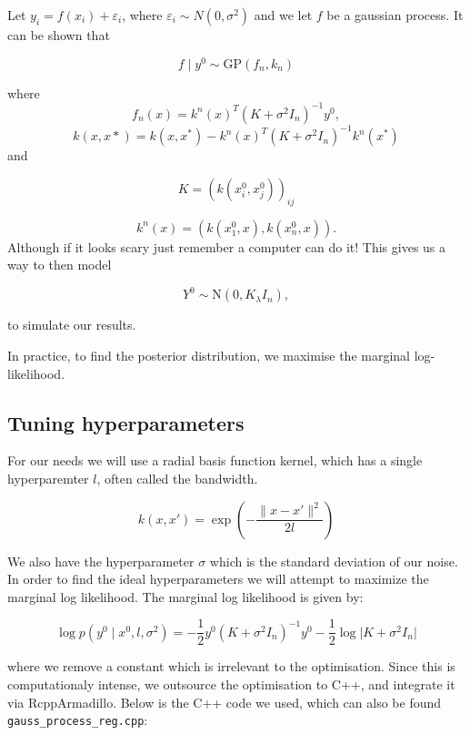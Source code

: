 \documentclass[
]{article}
\begin{document}
Let \(y_i = f(x_i) + \varepsilon_i\), where
\(\varepsilon_i \sim N(0, \sigma^2)\) and we let \(f\) be a gaussian
process. It can be shown that

\[
f \mid y^0 \sim \text{GP}(f_n,k_n)
\]

where \[f_n(x) = k^n(x)^T(K + \sigma^2I_n)^{-1}y^0,\]
\[k(x,x*) = k(x, x^*) - k^n(x)^T (K + \sigma^2 I_n)^{-1} k^n(x^*)\] and

\[
K = (k(x_i^0,x_j^0))_{ij}
\]

\[
k^n(x) = (k(x_1^0,x),k(x_n^0,x)).
\] Although if it looks scary just remember a computer can do it! This
gives us a way to then model

\[Y^0 \sim \text{N}(0,K _ \lambda I_n),\]

to simulate our results.

In practice, to find the posterior distribution, we maximise the
marginal log-likelihood.

\hypertarget{tuning-hyperparameters}{%
\subsection{Tuning hyperparameters}\label{tuning-hyperparameters}}

For our needs we will use a radial basis function kernel, which has a
single hyperparemter \(l\), often called the bandwidth.

\[
k(x, x') = \exp\left(-\frac{\lVert x - x' \rVert^2}{2l}\right)
\]

We also have the hyperparameter \(\sigma\) which is the standard
deviation of our noise. In order to find the ideal hyperparameters we
will attempt to maximize the marginal log likelihood. The marginal log
likelihood is given by:

\[
\log p(y^0 \mid x^0, l,\sigma^2) = -\frac{1}{2} y^0 (K + \sigma^2 I_n)^{-1} y^0 - \frac{1}{2} \log \lvert K + \sigma^2 I_n \rvert 
\]

where we remove a constant which is irrelevant to the optimisation.
Since this is computationaly intense, we outsource the optimisation to
C++, and integrate it via RcppArmadillo. Below is the C++ code we used,
which can also be found \texttt{gauss\_process\_reg.cpp}:
\end{document}
